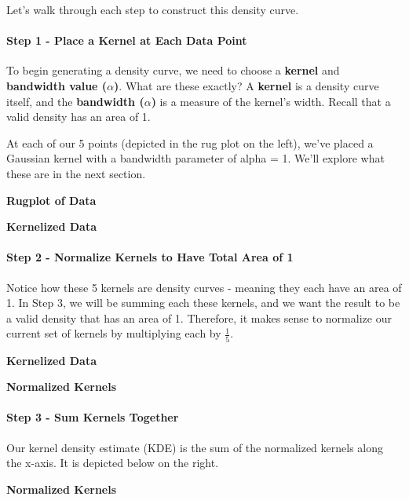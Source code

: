 \documentclass[
  letterpaper,
  DIV=11,
  numbers=noendperiod]{scrreprt}
\let\oldparagraph\paragraph
\renewcommand{\paragraph}[1]{\oldparagraph{#1}\mbox{}}
\begin{document}
Let's walk through each step to construct this density curve.

\hypertarget{step-1---place-a-kernel-at-each-data-point}{%
\paragraph{Step 1 - Place a Kernel at Each Data
Point}\label{step-1---place-a-kernel-at-each-data-point}}

To begin generating a density curve, we need to choose a \textbf{kernel}
and \textbf{bandwidth value (\(\alpha\))}. What are these exactly? A
\textbf{kernel} is a density curve itself, and the \textbf{bandwidth
(\(\alpha\))} is a measure of the kernel's width. Recall that a valid
density has an area of 1.

At each of our 5 points (depicted in the rug plot on the left), we've
placed a Gaussian kernel with a bandwidth parameter of alpha = 1. We'll
explore what these are in the next section.

\textbf{Rugplot of Data}

\textbf{Kernelized Data}

\hypertarget{step-2---normalize-kernels-to-have-total-area-of-1}{%
\paragraph{Step 2 - Normalize Kernels to Have Total Area of
1}\label{step-2---normalize-kernels-to-have-total-area-of-1}}

Notice how these 5 kernels are density curves - meaning they each have
an area of 1. In Step 3, we will be summing each these kernels, and we
want the result to be a valid density that has an area of 1. Therefore,
it makes sense to normalize our current set of kernels by multiplying
each by \(\frac{1}{5}\).

\textbf{Kernelized Data}

\textbf{Normalized Kernels}

\hypertarget{step-3---sum-kernels-together}{%
\paragraph{Step 3 - Sum Kernels
Together}\label{step-3---sum-kernels-together}}

Our kernel density estimate (KDE) is the sum of the normalized kernels
along the x-axis. It is depicted below on the right.

\textbf{Normalized Kernels}
\end{document}
